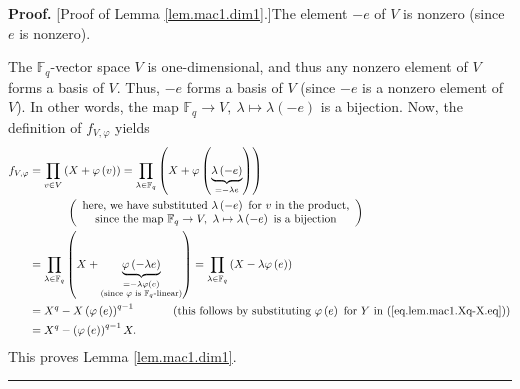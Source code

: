 \documentclass[numbers=enddot,12pt,final,onecolumn,notitlepage]{scrartcl}%
\theoremstyle{definition}
\newenvironment{proof}[1][Proof]{\noindent\textbf{#1.} }{\ \rule{0.5em}{0.5em}}
\let\prodnonlimits\prod
\renewcommand{\prod}{\prodnonlimits\limits}
\begin{document}
\begin{proof}
[Proof of Lemma \ref{lem.mac1.dim1}.]The element $-e$ of $V$ is nonzero (since
$e$ is nonzero).

The $\mathbb{F}_{q}$-vector space $V$ is one-dimensional, and thus any nonzero
element of $V$ forms a basis of $V$. Thus, $-e$ forms a basis of $V$ (since
$-e$ is a nonzero element of $V$). In other words, the map $\mathbb{F}%
_{q}\rightarrow V,\ \lambda\mapsto\lambda\left(  -e\right)  $ is a bijection.
Now, the definition of $f_{V,\varphi}$ yields%
\begin{align*}
f_{V,\varphi}  &  =\prod_{v\in V}\left(  X+\varphi\left(  v\right)  \right)
=\prod_{\lambda\in\mathbb{F}_{q}}\left(  X+\varphi\left(  \underbrace{\lambda
\left(  -e\right)  }_{=-\lambda e}\right)  \right) \\
&  \ \ \ \ \ \ \ \ \ \ \left(
\begin{array}
[c]{c}%
\text{here, we have substituted }\lambda\left(  -e\right)  \text{ for }v\text{
in the product,}\\
\text{since the map }\mathbb{F}_{q}\rightarrow V,\ \lambda\mapsto
\lambda\left(  -e\right)  \text{ is a bijection}%
\end{array}
\right) \\
&  =\prod_{\lambda\in\mathbb{F}_{q}}\left(  X+\underbrace{\varphi\left(
-\lambda e\right)  }_{\substack{=-\lambda\varphi\left(  e\right)
\\\text{(since }\varphi\text{ is }\mathbb{F}_{q}\text{-linear)}}}\right)
=\prod_{\lambda\in\mathbb{F}_{q}}\left(  X-\lambda\varphi\left(  e\right)
\right) \\
&  =X^{q}-X\left(  \varphi\left(  e\right)  \right)  ^{q-1}%
\ \ \ \ \ \ \ \ \ \ \left(  \text{this follows by substituting }\varphi\left(
e\right)  \text{ for }Y\text{ in (\ref{eq.lem.mac1.Xq-X.eq})}\right) \\
&  =X^{q}-\left(  \varphi\left(  e\right)  \right)  ^{q-1}X.
\end{align*}
This proves Lemma \ref{lem.mac1.dim1}.
\end{proof}
\end{document}
